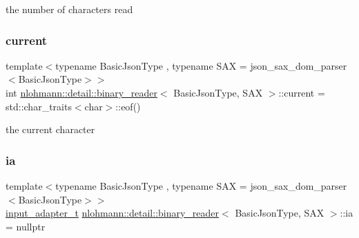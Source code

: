 the number of characters read 

\mbox{\label{classnlohmann_1_1detail_1_1binary__reader_aadd621ccddf3539f2ed4e2038d531870}} 
\subsubsection{\texorpdfstring{current}{current}}
{\footnotesize\ttfamily template$<$typename Basic\+Json\+Type , typename S\+AX  = json\+\_\+sax\+\_\+dom\+\_\+parser$<$\+Basic\+Json\+Type$>$$>$ \\
int \mbox{\hyperlink{classnlohmann_1_1detail_1_1binary__reader}{nlohmann\+::detail\+::binary\+\_\+reader}}$<$ Basic\+Json\+Type, S\+AX $>$\+::current = std\+::char\+\_\+traits$<$char$>$\+::eof()\hspace{0.3cm}{\ttfamily [private]}}



the current character 

\mbox{\label{classnlohmann_1_1detail_1_1binary__reader_a21ceb754c46a4920b966be7de48c34ad}} 
\subsubsection{\texorpdfstring{ia}{ia}}
{\footnotesize\ttfamily template$<$typename Basic\+Json\+Type , typename S\+AX  = json\+\_\+sax\+\_\+dom\+\_\+parser$<$\+Basic\+Json\+Type$>$$>$ \\
\mbox{\hyperlink{namespacenlohmann_1_1detail_ae132f8cd5bb24c5e9b40ad0eafedf1c2}{input\+\_\+adapter\+\_\+t}} \mbox{\hyperlink{classnlohmann_1_1detail_1_1binary__reader}{nlohmann\+::detail\+::binary\+\_\+reader}}$<$ Basic\+Json\+Type, S\+AX $>$\+::ia = nullptr\hspace{0.3cm}{\ttfamily [private]}}



